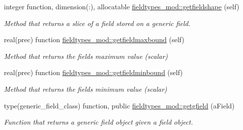 \begin{DoxyCompactItemize}
integer function, dimension(\+:), allocatable \mbox{\hyperlink{namespacefieldtypes__mod_ab8a0fa52771fc81b6f8a39cbb9ad2c34}{fieldtypes\+\_\+mod\+::getfieldshape}} (self)
\begin{DoxyCompactList}\small\item\em Method that returns a slice of a field stored on a generic field. \end{DoxyCompactList}\item 
real(prec) function \mbox{\hyperlink{namespacefieldtypes__mod_a1012f73b2800753dd774d0dbff861b6f}{fieldtypes\+\_\+mod\+::getfieldmaxbound}} (self)
\begin{DoxyCompactList}\small\item\em Method that returns the field\textquotesingle{}s maximum value (scalar) \end{DoxyCompactList}\item 
real(prec) function \mbox{\hyperlink{namespacefieldtypes__mod_aec092e7c0b82a7b3a828ae18af80b810}{fieldtypes\+\_\+mod\+::getfieldminbound}} (self)
\begin{DoxyCompactList}\small\item\em Method that returns the field\textquotesingle{}s minimum value (scalar) \end{DoxyCompactList}\item 
type(generic\+\_\+field\+\_\+class) function, public \mbox{\hyperlink{namespacefieldtypes__mod_a73c64e544ca15d30975aad5a35c2d904}{fieldtypes\+\_\+mod\+::getgfield}} (a\+Field)
\begin{DoxyCompactList}\small\item\em Function that returns a generic field object given a field object. \end{DoxyCompactList}\end{DoxyCompactItemize}
